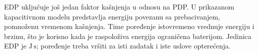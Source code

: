EDP uključuje još jedan faktor kašnjenja u odnosu na PDP. U prikazanom kapacitivnom modelu predstavlja energiju povezanu sa prebacivanjem, pomnoženu vremenom kašnjenja. Time poređenje istovremeno vrednuje energiju i brzinu, što je korisno kada je raspoloživa energija ograničena baterijom. Jedinica EDP je $\mathrm{J\,s}$; poređenje treba vršiti za isti zadatak i iste uslove opterećenja.
